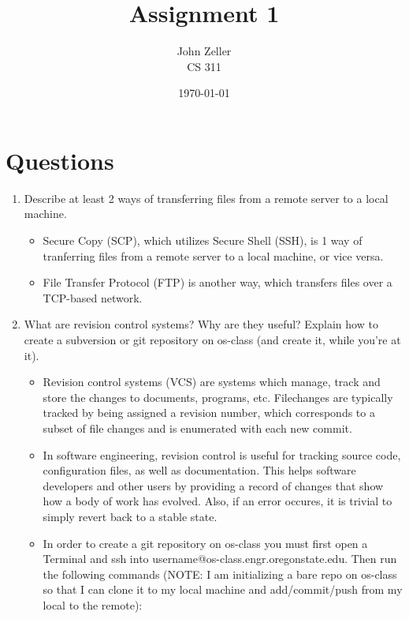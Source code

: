 \documentclass[12pt, letterpaper]{article}
\begin{document}
\begin{titlepage}
	\title{Assignment 1}
		\author{John Zeller\\
		  CS 311}
		\date{\today}
	\maketitle
\end{titlepage}

\section{Questions}
\begin{enumerate}
	\item Describe at least 2 ways of transferring files from a remote server to a local machine. \hfill
		\begin{itemize}
			\item Secure Copy (SCP), which utilizes Secure Shell (SSH), is 1 way of tranferring files from a remote server to a local machine, or vice versa.
			\item File Transfer Protocol (FTP) is another way, which transfers files over a TCP-based network.
		\end{itemize}
	\item What are revision control systems? Why are they useful? Explain how to create a subversion or git repository on os-class (and create it, while you're at it). \hfill
		\begin{itemize}
			\item Revision control systems (VCS) are systems which manage, track and store the changes to documents, programs, etc. Filechanges are typically tracked by being assigned a revision number, which corresponds to a subset of file changes and is enumerated with each new commit.
			\item In software engineering, revision control is useful for tracking source code, configuration files, as well as documentation. This helps software developers and other users by providing a record of changes that show how a body of work has evolved. Also, if an error occures, it is trivial to simply revert back to a stable state.
			\item In order to create a git repository on os-class you must first open a Terminal and ssh into username@os-class.engr.oregonstate.edu. Then run the following commands (NOTE: I am initializing a bare repo on os-class so that I can clone it to my local machine and add/commit/push from my local to the remote):
			\begin{lstlisting}[xleftmargin=-30.0ex]

\end{lstlisting}
\end{itemize}
\end{enumerate}
\end{document}
